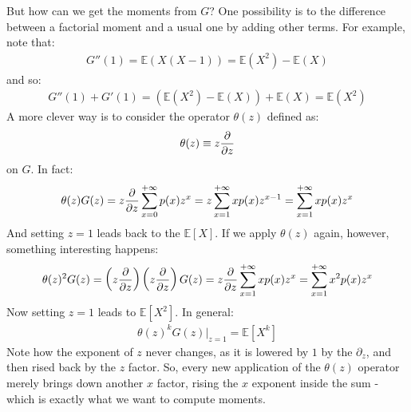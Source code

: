 \documentclass[../template.tex]{subfiles}
\begin{document}
But how can we get the  moments from $G$? One possibility is to  the difference between a factorial moment and a usual one by adding other terms. For example, note that:
\begin{align*}
    G''(1) = \mathbb{E}(X(X-1)) = \mathbb{E}(X^2) - \mathbb{E}(X)
\end{align*}   
and so:
\begin{align*}
    G''(1) + G'(1) = (\mathbb{E}(X^2) - \mathbb{E}(X)) + \mathbb{E}(X) = \mathbb{E}(X^2)
\end{align*}
A more clever way is to consider the operator $\theta(z)$ defined as:
\begin{align*}
    \theta(z) \equiv z\pdv{z}
\end{align*}
on $G$. In fact:
\begin{align*}
    \theta(z) G(z) = z \pdv{z} \sum_{x=0}^{+\infty} p(x) z^x = z \sum_{x=1}^{+\infty} x p(x) z^{x-1} = \sum_{x=1}^{+\infty} x p(x) z^x
\end{align*} 
And setting $z=1$ leads back to the $\mathbb{E}[X]$. If we apply $\theta(z)$ again, however, something interesting happens:
\begin{align}
    \theta(z)^2 G(z) = \left(z \pdv{z}\right)\left(z \pdv{z}\right) G(z) = z \pdv{z} \sum_{x=1}^{+\infty} xp(x) z^x = \sum_{x=1}^{+\infty} x^2 p(x) z^{x}
    \label{eqn:second-moment}
\end{align}
Now setting $z=1$ leads to $\mathbb{E}[X^2]$. In general:
\begin{align*}
    \theta(z)^k G(z) \Big|_{z=1} = \mathbb{E}[X^k]
\end{align*}  
Note how the exponent of $z$ never changes, as it is lowered by $1$ by the $\partial_z$, and then rised back by the $z$ factor. So, every new application of the $\theta(z)$ operator merely brings down another $x$ factor, rising the $x$ exponent inside the sum - which is exactly what we want to compute moments.      
\end{document}

